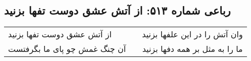 \begin{center}
\section*{رباعی شماره ۵۱۳: از آتش عشق دوست تفها بزنید}
\label{sec:0513}
\begin{longtable}{l p{0.5cm} r}
از آتش عشق دوست تفها بزنید
&&
وان آتش را در این علفها بزنید
\\
آن چنگ غمش چو پای ما بگرفتست
&&
ما را به مثل بر همه دفها بزنید
\\
\end{longtable}
\end{center}
